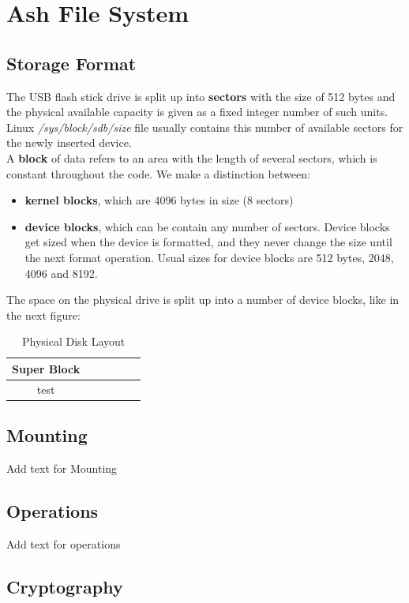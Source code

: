 \documentclass[conference]{IEEEtran}
\begin{document}
\section{Ash File System}

\subsection{Storage Format}
The USB flash stick drive is split up into {\bf sectors} with the size of 512 bytes and the physical available
capacity is given as a fixed integer number of such units. Linux {\em /sys/block/sdb/size} file usually contains 
this number of available sectors for the newly inserted device.\\

A {\bf block} of data refers to an area with the length of
several sectors, which is constant throughout the code. We make a distinction between:
\begin{itemize}
\item
{\bf kernel blocks}, which are 4096 bytes in size (8 sectors)
\item
{\bf device blocks}, which can be contain any number of sectors. Device blocks get sized when the device is formatted, and
they never change the size until the next format operation. Usual sizes for device blocks are 512 bytes, 2048, 4096 and 8192.
\end{itemize}

The space on the physical drive is split up into a number of device blocks, like in the next figure:
\begin{table}
\centering
\begin{tabular}{|c||c|c|c|c|c|}
\hline
Super Block\\
\hline
test\\
\hline
\end{tabular}
\caption{Physical Disk Layout}
\label{table_phys}
\end{table}



\subsection{Mounting}
Add text for Mounting 

\subsection{Operations}
Add text for operations

\subsection{Cryptography}
\end{document}
